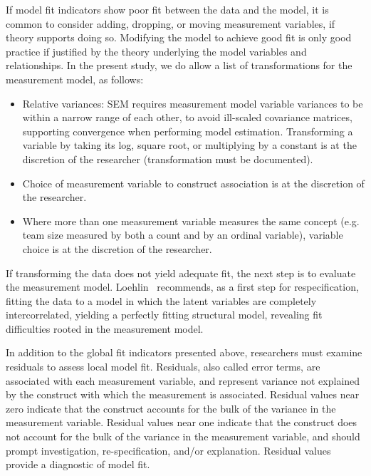 If model fit indicators show poor fit between the data and the model, it is common to consider adding, dropping, or moving measurement variables, if theory supports doing so. Modifying the model to achieve good fit is only good practice if justified by the theory underlying the model variables and relationships. In the present study, we do allow a list of transformations for the measurement model, as follows:
\begin{itemize}
	\item Relative variances: SEM requires measurement model variable variances to be within a narrow range of each other, to avoid ill-scaled covariance matrices, supporting convergence when performing model estimation. Transforming a variable by taking its log, square root, or multiplying by a constant is at the discretion of the researcher (transformation must be documented).
	\item Choice of measurement variable to construct association is at the discretion of the researcher.
	\item Where more than one measurement variable measures the same concept (e.g. team size measured by both a count and by an ordinal variable), variable choice is at the discretion of the researcher.
\end{itemize} 

If transforming the data does not yield adequate fit, the next step is to evaluate the measurement model. Loehlin~\cite{loehlin1986latent} recommends, as a first step for respecification,  fitting the data to a model in which the latent variables are completely intercorrelated, yielding a perfectly fitting structural model, revealing fit difficulties rooted in the measurement model. 

In addition to the global fit indicators presented above, researchers must examine residuals to assess local model fit. Residuals, also called error terms, are associated with each measurement variable, and represent variance not explained by the construct with which the measurement is associated. Residual values near zero indicate that the construct accounts for the bulk of the variance in the measurement variable. Residual values near one indicate that the construct does not account for the bulk of the variance in the measurement variable, and should prompt investigation, re-specification, and/or explanation. Residual values provide a diagnostic of model fit.

